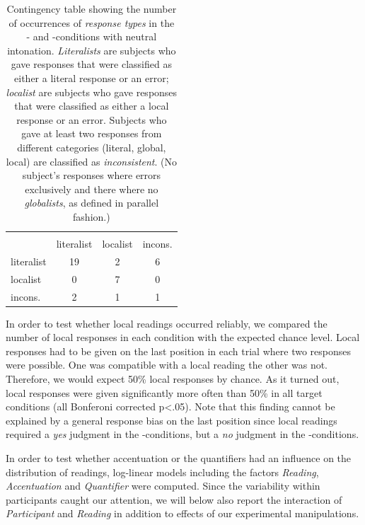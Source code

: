 \documentclass[fleqn,reqno,10pt,draft]{article}
\newcommand{\as}{\acro{as}}
\renewcommand{\es}{\acro{es}}
\begin{document}
%
\begin{table}[t]
  \centering
      \begin{tabular}{lccc}
      & \multicolumn{3}{c}{\es} \\ \cmidrule(r){2-4}
      \as & literalist & localist & incons. \\ \midrule
      literalist   & 19 & 2 & 6\\
      localist     &  0 & 7 & 0 \\
      incons. &  2 & 1 & 1\\
    \end{tabular}
    \caption{Contingency table showing the number of occurrences of
      \emph{response types} in the \as- and \es-conditions with
      neutral intonation. \emph{Literalists} are subjects who gave
      responses that were classified as either a literal response or
      an error; \emph{localist} are subjects who gave responses
      that were classified as either a 
      local response or an error. Subjects who gave at least two
      responses from different categories (literal, global, local) are
      classified as \emph{inconsistent}. (No subject's responses where
      errors exclusively and there where no \emph{globalists}, as
      defined in parallel fashion.)}
    \label{table:answer-types-as}
\end{table}
%

In order to test whether local readings occurred reliably, we compared the
number of local responses in each condition with the expected
 chance level. Local responses had to be given on the last position in
each trial where two responses were
possible. One was compatible with a local reading the other was
not. Therefore, we would expect 50\% local responses by chance. As it
turned out, local responses were given significantly more often than
50\% in all target conditions (all Bonferoni corrected p<.05). Note
that this finding cannot be explained by a general response
bias on the last position since local readings required a \emph{yes} judgment
in the \es-conditions, but a \emph{no} judgment in the \as-conditions.


In order to test whether accentuation or the quantifiers had an
influence on the distribution of readings, log-linear models 
including the factors {\it Reading}, {\it Accentuation} and 
{\it Quantifier} were computed. Since the variability within participants caught
our attention, we will below also report the interaction of {\it Participant} and {\it Reading}
in addition to effects of our experimental manipulations.
\end{document}
